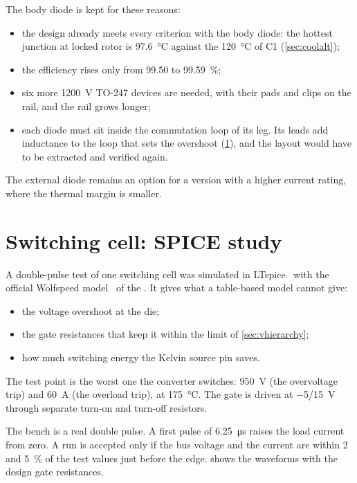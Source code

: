 The body diode is kept for these reasons:
\begin{itemize}
  \item the design already meets every criterion with the body diode: the
        hottest junction at locked rotor is \SI{97.6}{\celsius} against the
        \SI{120}{\celsius} of C1 (\cref{sec:coolalt});
  \item the efficiency rises only from \SI{99.50}{} to \SI{99.59}{\percent};
  \item six more \SI{1200}{\volt} TO-247 devices are needed, with their pads
        and clips on the rail, and the rail grows longer;
  \item each diode must sit inside the commutation loop of its leg. Its leads
        add inductance to the loop that sets the overshoot (\cref{sec:kelvin}),
        and the layout would have to be extracted and verified again.
\end{itemize}
The external diode remains an option for a version with a higher current
rating, where the thermal margin is smaller.

\section{Switching cell: SPICE study}
\label{sec:kelvin}

A double-pulse test of one switching cell was simulated in
LTspice~\cite{ltspice} with the official Wolfspeed
model~\cite{wolfspeed_spice} of the \device{}. It gives what a table-based
model cannot give:
\begin{itemize}
  \item the voltage overshoot at the die;
  \item the gate resistances that keep it within the limit of
        \cref{sec:vhierarchy};
  \item how much switching energy the Kelvin source pin saves.
\end{itemize}
The test point is the worst one the converter switches: \SI{950}{\volt} (the
overvoltage trip) and \SI{60}{\ampere} (the overload trip), at
\SI{175}{\celsius}. The gate is driven at \SI{-5}{}/\SI{+15}{\volt}
through separate turn-on and turn-off resistors.

The bench is a real double pulse. A first pulse of \SI{6.25}{\micro\second}
raises the load current from zero. A run is accepted only if the bus voltage
and the current are within \SI{2}{} and \SI{5}{\percent} of the test values
just before the edge.  shows the waveforms with the design gate
resistances.

